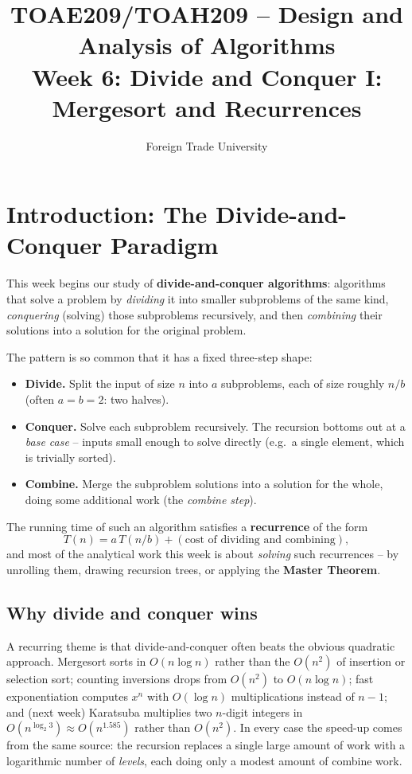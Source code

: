 \documentclass[11pt]{article}
\title{TOAE209/TOAH209 -- Design and Analysis of Algorithms\\[4pt]
\large Week 6: Divide and Conquer I: Mergesort and Recurrences}
\author{Foreign Trade University}
\date{}
\begin{document}
\maketitle
\tableofcontents

\section{Introduction: The Divide-and-Conquer Paradigm}

This week begins our study of \textbf{divide-and-conquer algorithms}: algorithms that
solve a problem by \emph{dividing} it into smaller subproblems of the same kind,
\emph{conquering} (solving) those subproblems recursively, and then \emph{combining} their
solutions into a solution for the original problem.

The pattern is so common that it has a fixed three-step shape:

\begin{itemize}
    \item \textbf{Divide.} Split the input of size $n$ into $a$ subproblems, each of size
    roughly $n/b$ (often $a = b = 2$: two halves).
    \item \textbf{Conquer.} Solve each subproblem recursively. The recursion bottoms out
    at a \emph{base case} -- inputs small enough to solve directly (e.g.\ a single
    element, which is trivially sorted).
    \item \textbf{Combine.} Merge the subproblem solutions into a solution for the whole,
    doing some additional work (the \emph{combine step}).
\end{itemize}

The running time of such an algorithm satisfies a \textbf{recurrence} of the form
\[
    T(n) = a\,T(n/b) + (\text{cost of dividing and combining}),
\]
and most of the analytical work this week is about \emph{solving} such recurrences -- by
unrolling them, drawing recursion trees, or applying the \textbf{Master Theorem}.

\subsection{Why divide and conquer wins}

A recurring theme is that divide-and-conquer often beats the obvious quadratic approach.
Mergesort sorts in $O(n \log n)$ rather than the $O(n^2)$ of insertion or selection sort;
counting inversions drops from $O(n^2)$ to $O(n \log n)$; fast exponentiation computes
$x^n$ with $O(\log n)$ multiplications instead of $n-1$; and (next week) Karatsuba
multiplies two $n$-digit integers in $O(n^{\log_2 3}) \approx O(n^{1.585})$ rather than
$O(n^2)$. In every case the speed-up comes from the same source: the recursion replaces a
single large amount of work with a logarithmic number of \emph{levels}, each doing only a
modest amount of combine work.
\end{document}

